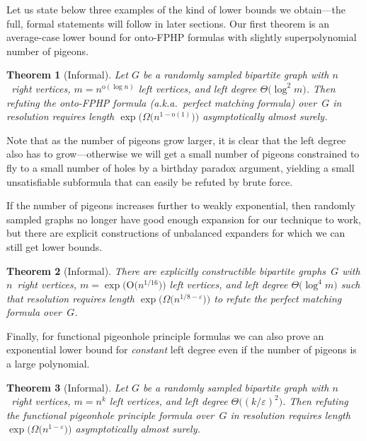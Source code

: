 \documentclass{article}
\newtheorem{theorem}{Theorem}\newtheorem{lemma}[theorem]{Lemma}\newtheorem{proposition}[theorem]{Proposition}\newtheorem{corollary}[theorem]{Corollary}\newtheorem{definition}[theorem]{Definition}\newtheorem{claim}[theorem]{Claim}\newtheorem{remark}[theorem]{Remark}
\newcommand{\Bigoh}[1]{\mathrm{O} \bigl( #1 \bigr)}
\newcommand{\littleoh}[1]{\mathrm{o} ( #1 )}
\newcommand{\Bigtheta}[1]{\Theta \bigl( #1 \bigr)}
\newcommand{\Bigomega}[1]{\Omega \bigl( #1 \bigr)}
\newcommand{\exponentalpha}{\varepsilon}
\numberwithin{equation}{section}
\begin{document}
Let us state below three examples of the kind of lower bounds we
obtain---the full, formal statements will follow in later sections.
Our first theorem is an average-case lower bound for 
onto-FPHP formulas with slightly superpolynomial number of pigeons.

\begin{theorem}[Informal]
  \label{th:informal-quasipoly-npigeons}  
  Let
  $G$ be a randomly sampled bipartite graph with
  $n$~right vertices, \mbox{$m = n^{\littleoh{\log n}}$} left vertices, and left
  degree
  $\Bigtheta{\log^2 m}$.
  Then refuting
  the onto-FPHP formula (a.k.a.~perfect matching formula) over~$G$
  in resolution
  requires length
  $\exp \bigl( \Bigomega{n^{1-\littleoh{1}}} \bigr)$ 
  asymptotically almost surely.
\end{theorem}


Note that as the number of pigeons grow larger, it is clear that
the left degree also has to grow---otherwise we will get a small
number of pigeons constrained to fly to a small number of holes by a
birthday paradox argument, 
yielding
a small unsatisfiable
subformula that can easily be refuted by brute force.

If the number of pigeons increases further to weakly exponential, then
randomly sampled graphs no longer have good enough expansion for our
technique to work, but there are explicit constructions of unbalanced
expanders for which we can still get lower bounds.

\begin{theorem}[Informal]
  \label{th:informal-exponential-npigeons}
  There are explicitly constructible bipartite graphs~$G$ with
  $n$~right vertices, \mbox{$m = \exp \bigl( \Bigoh{n^{1/16}} \bigr)$}
  left vertices, and left degree $\Bigtheta{\log^4 m}$ such that
  resolution requires length
  $\exp \bigl( \Bigomega{n^{1/8 - \exponentalpha}} \bigr)$ to refute
  the perfect matching formula over~$G$.
\end{theorem}


Finally, for functional pigeonhole principle formulas we can also
prove an exponential lower bound for \emph{constant} left degree even if the
number of pigeons is a large polynomial.


\begin{theorem}[Informal]
  \label{th:informal-poly-npigeons}
  Let
  $G$ be a randomly sampled bipartite graph with
  $n$~right vertices, \mbox{$m = n^{k}$} left vertices, and left
  degree
  $\Bigtheta{(k / \varepsilon)^2}$.
  Then refuting the functional pigeonhole principle formula
  over~$G$
  in resolution
  requires length
  $\exp \bigl( \Bigomega{n^{1-\varepsilon}} \bigr)$ 
  asymptotically almost surely.
   \end{theorem}
\end{document}
